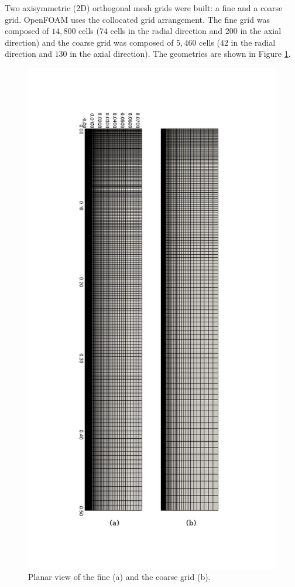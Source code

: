Two axisymmetric (2D) orthogonal mesh grids were built: a fine and a coarse grid. OpenFOAM uses the collocated grid arrangement. The fine grid was composed of $14,800$ cells ($74$ cells in the radial direction and $200$ in the axial direction) and the coarse grid was composed of $5,460$ cells ($42$ in the radial direction and $130$ in the axial direction). The geometries are shown in Figure \ref{fig: meshes}.

\begin{figure}[!htb]
 \centering
 \includegraphics[height=0.9\textheight]{./figuras/chap4/grid.png}
 \caption{Planar view of the fine (a) and the coarse grid (b).}
\label{fig: meshes}
\end{figure}

